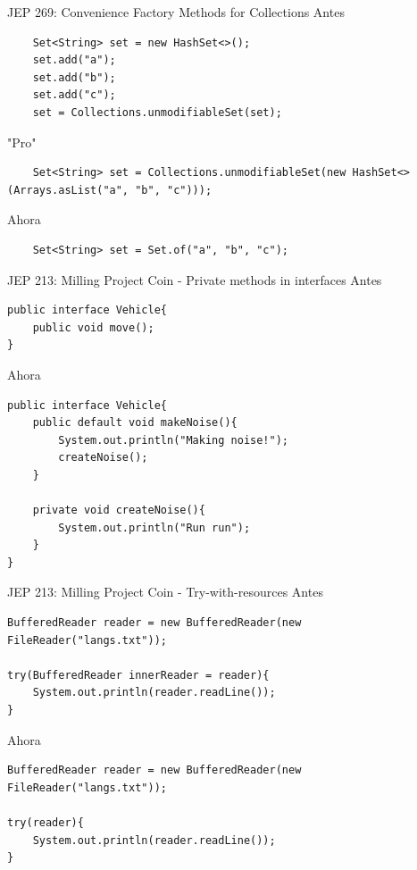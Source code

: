 \documentclass[aspectratio=169]{beamer}
\begin{document}
\begin{frame}[fragile]{JEP 269: Convenience Factory Methods for Collections}
    Antes
    \begin{lstlisting}
    Set<String> set = new HashSet<>();
    set.add("a");
    set.add("b");
    set.add("c");
    set = Collections.unmodifiableSet(set);
    \end{lstlisting}	
    
    "Pro"
    \begin{lstlisting}
    Set<String> set = Collections.unmodifiableSet(new HashSet<>(Arrays.asList("a", "b", "c")));
    \end{lstlisting}	
    
    Ahora
    \begin{lstlisting}
    Set<String> set = Set.of("a", "b", "c");
    \end{lstlisting}	
    
\end{frame}


\begin{frame}[fragile]{JEP 213: Milling Project Coin - Private methods in interfaces}
Antes
\begin{lstlisting}
public interface Vehicle{
    public void move();
}
\end{lstlisting}	

Ahora
\begin{lstlisting}[basicstyle=\scriptsize]
public interface Vehicle{
    public default void makeNoise(){
        System.out.println("Making noise!");
        createNoise();
    }

    private void createNoise(){
        System.out.println("Run run");
    } 
}
\end{lstlisting}	
    
\end{frame}

\begin{frame}[fragile]{JEP 213: Milling Project Coin - Try-with-resources}
Antes
\begin{lstlisting}
BufferedReader reader = new BufferedReader(new FileReader("langs.txt"));

try(BufferedReader innerReader = reader){
    System.out.println(reader.readLine());
}
\end{lstlisting}	

Ahora
\begin{lstlisting}
BufferedReader reader = new BufferedReader(new FileReader("langs.txt"));

try(reader){
    System.out.println(reader.readLine());
}
\end{lstlisting}	
    
\end{frame}
\end{document}
